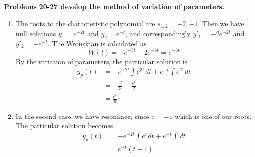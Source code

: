\documentclass[a4paper]{article}
\begin{document}
\newpage
\textbf{Problems 20-27 develop the method of variation of parameters.}

\vspace{12pt}


\begin{enumerate}[label=(\alph*)]
	\item The roots to the characteristic polynomial are \( s_{1,2} = -2, -1 \). Then we have null solutions \( y_{1} = e^{-2t} \) and \( y_{2} = e^{-t } \), and correspondingly \( y'_{1} = -2e^{-2t} \) and \( y'_{2} = -e^{-t } \). The Wronskian is calculated as 
\[
	W \!\left( t  \right) = -e^{-3t} + 2e^{-3t} = e^{-3t}
\]
By the variation of parameters, the particular solution is
\begin{align*}
	y_{p } \!\left( t  \right) & = - e^{-2t} \int e^{3t} \, dt + e^{-t } \int e^{2t } \, dt \\
	 & = -\frac{e^{t }}{3} + \frac{e^{t }}{2} \\ 
	 & = \frac{e^{t }}{6}
\end{align*}
	\item In the second case, we have resonance, since \( c = -1 \) which is one of our roots. The particular solution becomes
	\begin{align*}
		y_{p }\!\left( t  \right) & = -e^{-2t} \int e^{t } \, dt + e^{-t } \int \, dt  \\
		 & = e^{-t } \!\left( t - 1 \right)
	\end{align*}
\end{enumerate}

\end{document}
